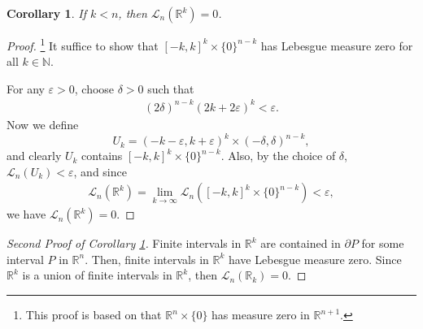 \documentclass[11pt]{book}
\newtheorem{corollary}{Corollary}[theorem]
\theoremstyle{definition}
\numberwithin{equation}{chapter}
\begin{document}
\medskip

\begin{corollary}\label{coro_19161}
If $k < n$, then $\mathcal{L}_n (\mathbb{R}^k) = 0$.
\end{corollary}
\begin{proof}\footnote{This proof is based on that $\mathbb{R}^n\times\{0\}$ has measure zero in $\mathbb{R}^{n+1}$\cite{16}.} 
It suffice to show that $[-k,k]^{k} \times \{0\}^{n-k}$ has Lebesgue measure zero for all $k \in \mathbb{N}$.

For any $\varepsilon > 0$, choose $\delta > 0$ such that
\begin{align*}
    (2\delta)^{n-k} (2k+2\varepsilon)^k < \varepsilon.
\end{align*}
Now we define $$U_k = (-k-\varepsilon,k+\varepsilon)^k \times (-\delta,\delta)^{n-k},$$ 
and clearly $U_k$ contains $[-k,k]^{k} \times \{0\}^{n-k}$. Also, by the choice of $\delta$, $\mathcal{L}_n(U_k) < \varepsilon$, and since
\begin{align*}
    \mathcal{L}_n(\mathbb{R}^k) = \lim_{k\to\infty} \mathcal{L}_n\left([-k,k]^{k} \times \{0\}^{n-k}\right) < \varepsilon,
\end{align*}
we have $\mathcal{L}_n(\mathbb{R}^k) = 0$.
\end{proof}

\medskip

\begin{proof}[Second Proof of Corollary \ref{coro_19161}]
Finite intervals in $\mathbb{R}^k$ are contained in $\partial P$ for some interval $P$ in $\mathbb{R}^n$. Then, finite intervals in $\mathbb{R}^k$ have Lebesgue measure zero. Since $\mathbb{R}^k$ is a union of finite intervals in $\mathbb{R}^k$, then $\mathcal{L}_n(\mathbb{R}_k) = 0$.
\end{proof}

\medskip
\end{document}
